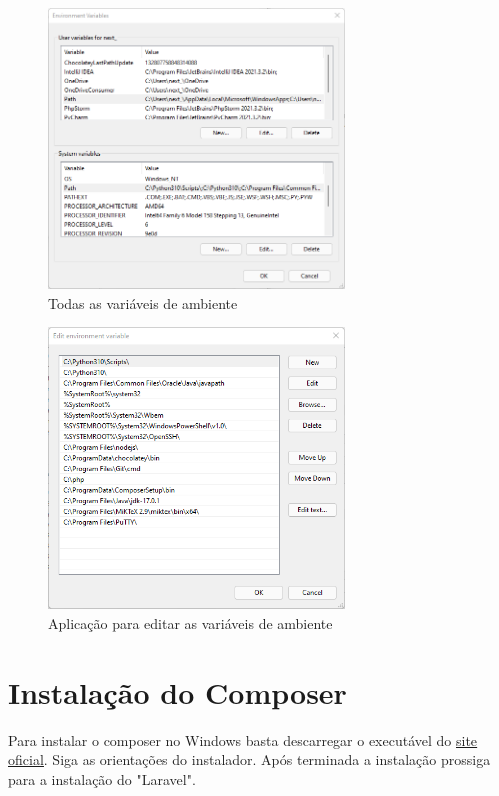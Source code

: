 \documentclass[11pt, twoside]{report}
\begin{document}
	\begin{figure}[H] 
		\centering 
		\includegraphics[width=0.7\textwidth,height=0.7\textheight,keepaspectratio]{images/todasvariaveis}
		\caption{Todas as variáveis de ambiente}
		\label{todasVariaveis}
	\end{figure}

	\begin{figure}[H] 
		\centering 
		\includegraphics[width=0.7\textwidth,height=0.7\textheight,keepaspectratio]{images/pathphp}
		\caption{Aplicação para editar as variáveis de ambiente}
		\label{pathphp}
	\end{figure}

\section{Instalação do Composer}

Para instalar o composer no Windows basta descarregar o executável do \href{https://getcomposer.org/Composer-Setup.exe}{\underline{site oficial}}. Siga as orientações do instalador. Após terminada a instalação prossiga para a instalação do "Laravel".
\end{document}
